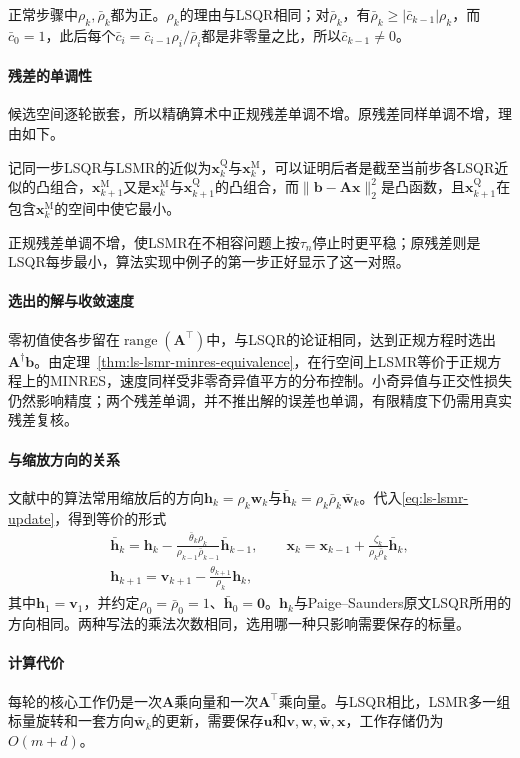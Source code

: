 正常步骤中$\rho_k,\bar\rho_k$都为正。$\rho_k$的理由与LSQR相同；对$\bar\rho_k$，有$\bar\rho_k\ge\lvert\bar c_{k-1}\rvert\rho_k$，而$\bar c_0=1$，此后每个$\bar c_i=\bar c_{i-1}\rho_i/\bar\rho_i$都是非零量之比，所以$\bar c_{k-1}\neq0$。

\paragraph{残差的单调性}
候选空间逐轮嵌套，所以精确算术中正规残差单调不增。原残差同样单调不增，理由如下。

记同一步LSQR与LSMR的近似为$\bm x_k^{\mathrm Q}$与$\bm x_k^{\mathrm M}$，可以证明后者是截至当前步各LSQR近似的凸组合，$\bm x_{k+1}^{\mathrm M}$又是$\bm x_k^{\mathrm M}$与$\bm x_{k+1}^{\mathrm Q}$的凸组合，而$\lVert\bm b-\bm A\bm x\rVert_2^2$是凸函数，且$\bm x_{k+1}^{\mathrm Q}$在包含$\bm x_k^{\mathrm M}$的空间中使它最小。

正规残差单调不增，使LSMR在不相容问题上按$\tau_n$停止时更平稳；原残差则是LSQR每步最小，算法实现中例子的第一步正好显示了这一对照。

\paragraph{选出的解与收敛速度}
零初值使各步留在$\operatorname{range}(\bm A^\top)$中，与LSQR的论证相同，达到正规方程时选出$\bm A^\dagger\bm b$。由定理~\ref{thm:ls-lsmr-minres-equivalence}，在行空间上LSMR等价于正规方程上的MINRES，速度同样受非零奇异值平方的分布控制。小奇异值与正交性损失仍然影响精度；两个残差单调，并不推出解的误差也单调，有限精度下仍需用真实残差复核。

\paragraph{与缩放方向的关系}
文献中的算法常用缩放后的方向$\bm h_k=\rho_k\bm w_k$与$\bar{\bm h}_k=\rho_k\bar\rho_k\bar{\bm w}_k$。代入\eqref{eq:ls-lsmr-update}，得到等价的形式
\begin{equation}
 \begin{gathered}
 \bar{\bm h}_k=\bm h_k-\frac{\bar\theta_k\rho_k}{\rho_{k-1}\bar\rho_{k-1}}\bar{\bm h}_{k-1},
 \qquad
 \bm x_k=\bm x_{k-1}+\frac{\zeta_k}{\rho_k\bar\rho_k}\bar{\bm h}_k,\\
 \bm h_{k+1}=\bm v_{k+1}-\frac{\theta_{k+1}}{\rho_k}\bm h_k ,
 \end{gathered}
 \label{eq:ls-lsmr-scaled-update}
\end{equation}
其中$\bm h_1=\bm v_1$，并约定$\rho_0=\bar\rho_0=1$、$\bar{\bm h}_0=\bm0$。$\bm h_k$与Paige--Saunders原文LSQR所用的方向相同。两种写法的乘法次数相同，选用哪一种只影响需要保存的标量。

\paragraph{计算代价}
每轮的核心工作仍是一次$\bm A$乘向量和一次$\bm A^\top$乘向量。与LSQR相比，LSMR多一组标量旋转和一套方向$\bar{\bm w}_k$的更新，需要保存$\bm u$和$\bm v,\bm w,\bar{\bm w},\bm x$，工作存储仍为$O(m+d)$。
